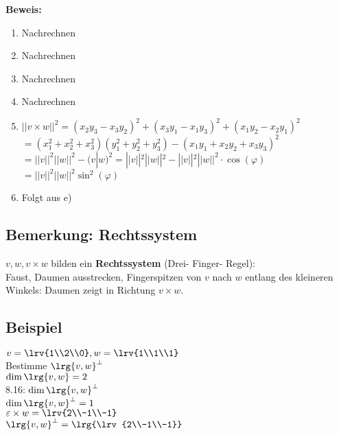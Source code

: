 	\textbf{Beweis:}
	\begin{enumerate}
		\item Nachrechnen
		\item Nachrechnen
		\item Nachrechnen
		\item Nachrechnen
		\item $ ||v\times w||^2=(x_2y_3-x_3y_2)^2+(x_3y_1-x_1y_3)^2+(x_1y_2-x_2y_1)^2 $\\
		$ =(x_1^2+x_2^2+x_3^2)(y_1^2+y_2^2+y_3^2)-(x_1y_1+x_2y_2+x_3y_3)^2 $\\
		$ = ||v||^2 ||w||^2-(v|w)^2=||v||^2||w||^2-||v||^2||w||^2\cdot\cos(\varphi) $\\
		$ = ||v||^2||w||^2\sin^2(\varphi)$
		\item Folgt aus e)
	\end{enumerate}

\subsection{Bemerkung: Rechtssystem}
	$ v,w,v\times w $ bilden ein \textbf{Rechtssystem} (Drei- Finger- Regel):\\
	Faust, Daumen ausstrecken, Fingerspitzen von $ v $ nach $ w $ entlang des kleineren Winkels: Daumen zeigt in Richtung $ v\times w $.

\subsection{Beispiel}
	$ v=\lrv{1\\2\\0},w=\lrv{1\\1\\1} $\\
	Bestimme $ \lrg{v,w}^\perp $\\
	$ \dim\lrg{v,w}=2 $\\
	8.16: $ \dim\lrg{v,w}^\perp $\\
	$ \dim\lrg{v,w}^\perp=1 $\\
	$ \varepsilon\times w=\lrv{2\\-1\\-1} $\\
	$ \lrg{v,w}^\perp=\lrg{\lrv{2\\-1\\-1}} $

